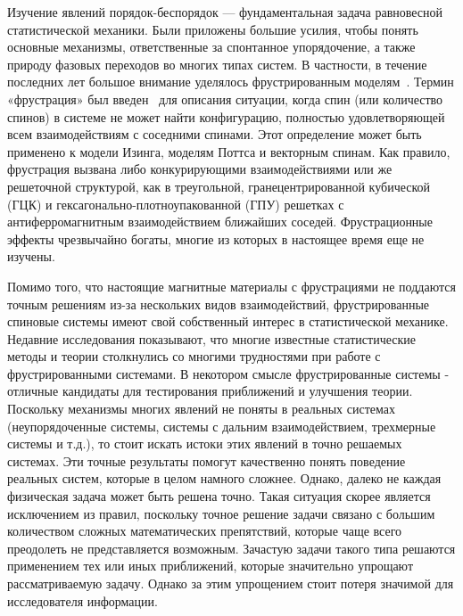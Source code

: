 
Изучение явлений порядок-беспорядок --- фундаментальная задача равновесной статистической механики. Были приложены большие усилия, чтобы понять основные механизмы, ответственные за спонтанное упорядочение, а также природу фазовых переходов во многих типах систем. В частности, в течение последних лет большое внимание уделялось фрустрированным моделям~\cite{liebmann1986}. Термин «фрустрация» был введен~\cite{toulouse1977,vannimenus1977} для описания ситуации, когда спин (или количество спинов) в системе не может найти конфигурацию, полностью удовлетворяющей всем взаимодействиям с соседними спинами. Этот определение может быть применено к модели Изинга, моделям Поттса и векторным спинам. Как правило, фрустрация вызвана либо конкурирующими взаимодействиями или же решеточной структурой, как в треугольной, гранецентрированной кубической (ГЦК) и гексагонально-плотноупакованной (ГПУ) решетках с антиферромагнитным взаимодействием ближайших соседей. Фрустрационные эффекты чрезвычайно богаты, многие из которых в настоящее время еще не изучены.

Помимо того, что настоящие магнитные материалы с фрустрациями не поддаются точным решениям из-за нескольких видов взаимодействий, фрустрированные спиновые системы имеют свой собственный интерес в статистической механике. Недавние исследования показывают, что многие известные статистические методы и теории столкнулись со многими трудностями при работе с фрустрированными системами. В некотором смысле фрустрированные системы - отличные кандидаты для тестирования приближений и улучшения теории. Поскольку механизмы многих явлений не поняты в реальных системах (неупорядоченные системы, системы с дальним взаимодействием, трехмерные системы и т.д.), то стоит искать истоки этих явлений в точно решаемых системах. Эти точные результаты помогут качественно понять поведение реальных систем, которые в целом намного сложнее.
Однако, далеко не каждая физическая задача может быть решена точно. Такая ситуация скорее является исключением из правил, поскольку точное решение задачи связано с большим количеством сложных математических препятствий, которые чаще всего преодолеть не представляется возможным. Зачастую задачи такого типа решаются применением тех или иных приближений, которые значительно упрощают рассматриваемую задачу. Однако за этим упрощением стоит потеря значимой для исследователя информации.

